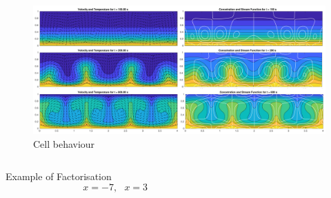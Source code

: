 \documentclass[final]{beamer}
\newlength{\onecolwid}
\newlength{\twocolwid}
\begin{document}
\begin{frame}[t]
\begin{columns}[t]
\begin{column}{\twocolwid}
\begin{columns}[t,totalwidth=\twocolwid]
\end{columns} %


\begin{figure}
\includegraphics[width=1.0\linewidth]{images/figure1.pdf}
\caption{Cell behaviour}
\end{figure}

\begin{columns}[t,totalwidth=\twocolwid] %

\begin{column}{\onecolwid} %


\begin{block}{Example of Factorisation}
$$x=-7,\ \ \ x=3$$

\end{block}


\end{column} %

\begin{column}{\onecolwid} %



\end{column}
\end{columns}
\end{column}
\end{columns}
\end{frame}
\end{document}
